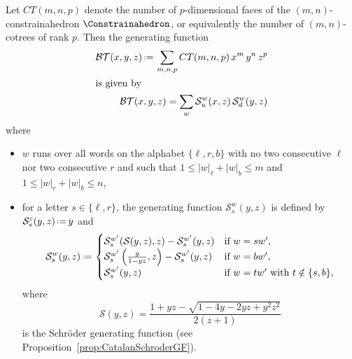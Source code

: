\documentclass[AHL,Unicode,longabstracts,published]{cedram}
\newcommand{\eqdef}{\mbox{\,\raisebox{0.2ex}{\scriptsize\ensuremath{\mathrm:}}\ensuremath{=}\,}}
\newcommand{\CTGF}{\mathcal{BT}}
\newcommand{\SGF}{\mathcal{S}}
\begin{document}
\begin{prop}\label{prop:numberFacesConstrainahedra}
Let $CT(m,n,p)$ denote the number of $p$-dimensional faces of the $(m,n)$-constraina\-hedron $\Constrainahedron$, or equivalently the number of $(m,n)$-cotrees of rank $p$. Then the generating function
\begin{align*}
\CTGF(x,y,z) \eqdef \sum_{m,n,p} CT(m,n,p) \, x^m \, y^n \, z^p
\\
\intertext{is given by}
\CTGF(x,y,z) = \sum_w \SGF^w_u(x,z) \, \SGF^w_d(y,z)
\end{align*}
where
\begin{itemize}
\item $w$ runs over all words on the alphabet $\{\ell,r,b\}$ with no two consecutive $\ell$ nor two consecutive $r$ and such that $1 \le |w|_\ell + |w|_b \le m$ and $1 \le |w|_r + |w|_b \le n$,
\item for a letter $s \in \{\ell,r\}$, the generating function $\SGF^w_s(y,z)$ is defined by\linebreak $\SGF^\varepsilon_s(y,z) \eqdef y$ and
\[
\SGF^{w}_s(y,z) \eqdef
\begin{cases}
\SGF^{w'}_s(\SGF(y,z), z) - \SGF^{w'}_s(y,z) & \text{if } w = sw', \\
\SGF^{w'}_s \left(\frac{y}{1-yz}, z \right) - \SGF^{w'}_s(y,z) & \text{if } w = bw', \\
\SGF^{w'}_s(y,z) & \text{if } w = tw' \text{ with } t \notin \{s,b\}, \\
\end{cases}
\]
where
\[
\SGF(y,z) = \frac{1+yz-\sqrt{1-4y-2yz+y^2z^2}}{2(z+1)}
\]
is the Schr\"oder generating function (see Proposition~\ref{prop:CatalanSchroderGF}).
\end{itemize}
\end{prop}
\end{document}
